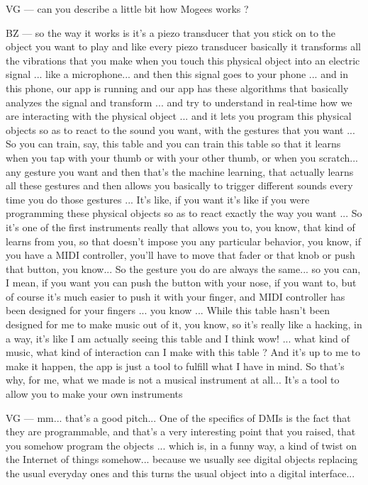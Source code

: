 VG — can you describe a little bit how Mogees works ?

BZ — so the way it works is it's a piezo transducer that you stick on to the object you want to play and like every piezo transducer basically it transforms all the vibrations that you make when you touch this physical object into an electric signal ... like a microphone... and then this signal goes to your phone ... and in this phone, our app is running and our app has these algorithms that basically analyzes the signal and transform ... and try to understand in real-time how we are interacting with the physical object ... and it lets you program this physical objects so as to react to the sound you want, with the gestures that you want ... So you can train, say, this table and you can train this table so that it learns when you tap with your thumb or with your other thumb, or when you scratch... any gesture you want and then that's the machine learning, that actually learns all these gestures and then allows you basically to trigger different sounds every time you do those gestures ... It's like, if you want it's like if you were programming these physical objects so as to react exactly the way you want ... So it's one of the first instruments really that allows you to, you know, that kind of learns from you, so that doesn't impose you any particular behavior, you know, if you have a MIDI controller, you'll have to move that fader or that knob or push that button, you know... So the gesture you do are always the same...  so you can, I mean, if you want you can push the button with your nose, if you want to, but of course it's much easier to push it with your finger, and MIDI controller has been designed for your fingers ... you know ... While this table hasn't been designed for me to make music out of it, you know, so it's really like a hacking, in a way, it's like I am actually seeing this table and I think wow! ... what kind of music, what kind of interaction can I make with this table ? And it's up to me to make it happen, the app is just a tool to fulfill what I have in mind. So that's why, for me, what we made is not a musical instrument at all... It's a tool to allow you to make your own instruments 

VG — mm... that's a good pitch... One of the specifics of DMIs is the fact that they are programmable, and that's a very interesting point that you raised, that you somehow program the objects ... which is, in a funny way, a kind of twist on the Internet of things somehow... because we usually see digital objects replacing the usual everyday ones and this turns the usual object into a digital interface... 

